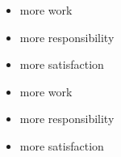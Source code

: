 \documentclass[twocolumn]{article}
\begin{document}
                      \blindtext
                        \begin{itemize}
                               \item more work
                               \item more responsibility
                               \item more satisfaction
                        \end{itemize}
                                         \blindtext
                                 \newpage
                                         \blindtext
                        \begin{itemize}[noitemsep]
                               \item more work
                               \item more responsibility
                               \item more satisfaction
                        \end{itemize}
                                          \blindtext
                
\end{document}
